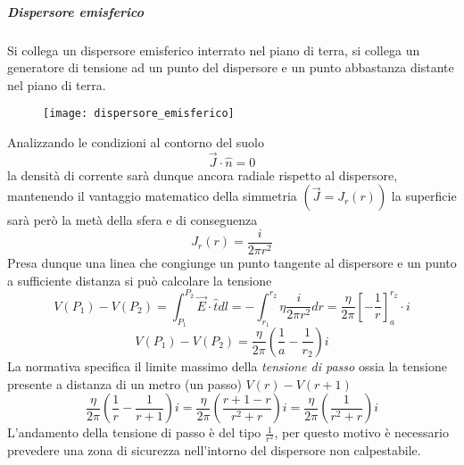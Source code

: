 \subparagraph{Dispersore emisferico}
Si collega un dispersore emisferico interrato nel piano di terra, si collega un
generatore di tensione ad un punto del dispersore e un punto abbastanza
distante nel piano di terra.
\begin{figure}[H]
\centering
\texttt{[image: dispersore\_emisferico]}
\end{figure}
Analizzando le condizioni al contorno del suolo
$$
\vec{J}\cdot\hat{n} = 0
$$
la densità di corrente sarà dunque ancora radiale rispetto al dispersore,
mantenendo il vantaggio matematico della simmetria $(\vec{J} = J_r(r))$
la superficie sarà però la metà della sfera e di conseguenza 
$$
J_r(r) = \frac{i}{2\pi r^2}
$$
Presa dunque una linea che congiunge un punto tangente al dispersore e un punto a
sufficiente distanza si può calcolare la tensione
$$
V(P_1) - V(P_2) = \int_{P_1}^{P_2} \vec{E}\cdot\hat{t} dl = -\int_{r_1}^{r_2} \eta\frac{i}{2\pi r^2} dr = \frac{\eta}{2\pi} \left[-\frac{1}{r}\right]_a^{r_2}\cdot i
$$
$$
V(P_1)-V(P_2) = \frac{\eta}{2\pi}\left(\frac{1}{a}-\frac{1}{r_2}\right) i
$$
La normativa specifica il limite massimo della \textit{tensione di passo}
ossia la tensione presente a distanza di un metro (un passo) $V(r) - V(r+1)$
$$
\frac{\eta}{2\pi}\left(\frac{1}{r} - \frac{1}{r+1}\right) i = \frac{\eta}{2\pi}\left(\frac{r+1 - r}{r^2 + r}\right) i = \frac{\eta}{2\pi}\left(\frac{1}{r^2+r}\right) i
$$
L'andamento della tensione di passo è del tipo $\frac{1}{r^2}$, per questo motivo è 
necessario prevedere una zona di sicurezza nell'intorno del dispersore non calpestabile.

